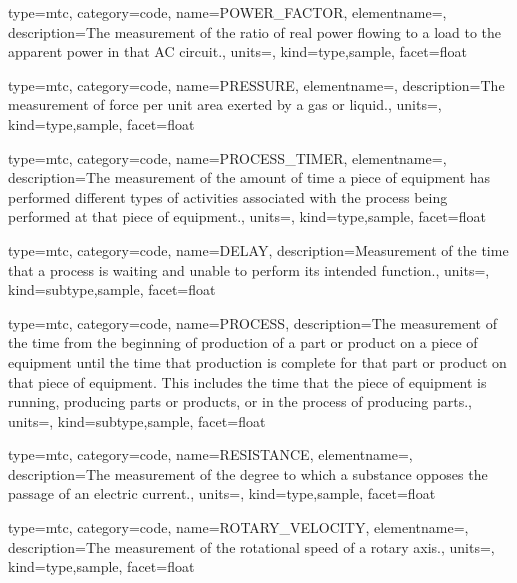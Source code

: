 {
  type=mtc,
  category=code,
  name={POWER\_FACTOR},
  elementname=,
  description={The measurement of the ratio of real power flowing to a load to the apparent power in that AC circuit.},
  units=,
  kind={type,sample},
  facet={\gls{float}}
}


{
  type=mtc,
  category=code,
  name={PRESSURE},
  elementname=,
  description={The measurement of force per unit area exerted by a gas or liquid.},
  units=,
  kind={type,sample},
  facet={\gls{float}}
}


{
  type=mtc,
  category=code,
  name={PROCESS\_TIMER},
  elementname=,
  description={The measurement of the amount of time a piece of equipment has performed different types of activities associated with the process being performed at that piece of equipment.},
  units=,
  kind={type,sample},
  facet={\gls{float}}
}


{
  type=mtc,
  category=code,
  name={DELAY},
  description={Measurement of the time that a process is waiting and unable to perform its intended function.},
  units=,
  kind={subtype,sample},
  facet={\gls{float}}
}


{
  type=mtc,
  category=code,
  name={PROCESS},
  description={The measurement of the time from the beginning of production of a part or product on a piece of equipment until the time that production is complete for that part or product on that piece of equipment.  This includes the time that the piece of equipment is running, producing parts or products, or in the process of producing parts.},
  units=,
  kind={subtype,sample},
  facet={\gls{float}}
}


{
  type=mtc,
  category=code,
  name={RESISTANCE},
  elementname=,
  description={The measurement of the degree to which a substance opposes the passage of an electric current.},
  units=,
  kind={type,sample},
  facet={\gls{float}}
}


{
  type=mtc,
  category=code,
  name={ROTARY\_VELOCITY},
  elementname=,
  description={The measurement of the rotational speed of a rotary axis.},
  units=,
  kind={type,sample},
  facet={\gls{float}}
}



